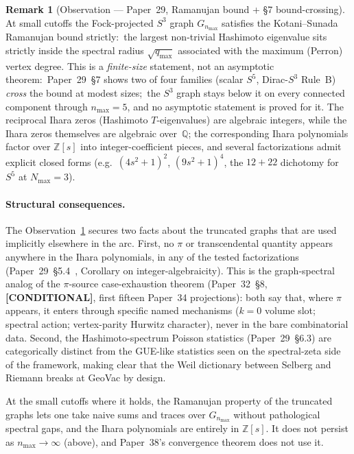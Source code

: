 \documentclass[11pt,a4paper]{article}
\theoremstyle{plain}
\theoremstyle{definition}
\newtheorem{remark}[theorem]{Remark}
\newcommand{\nmax}{n_{\max}}
\newcommand{\sthree}{S^{3}}
\newcommand{\sfive}{S^{5}}
\newcommand{\Z}{\mathbb{Z}}
\newcommand{\gvc}[2]{#2}
\begin{document}
\begin{remark}[Observation --- Paper~29, Ramanujan bound + \S7 bound-crossing]
\label{thm:ramanujan}
At small cutoffs the Fock-projected $\sthree$ graph $G_{\nmax}$
satisfies the Kotani--Sunada Ramanujan bound strictly:\ the largest
non-trivial Hashimoto eigenvalue sits strictly inside the spectral
radius $\sqrt{q_{\max}}$ associated with the maximum (Perron) vertex
degree.  This is a \emph{finite-size} statement, not an asymptotic
theorem:\ Paper~29~\S7 shows two of four families (scalar $\sfive$,
Dirac-$\sthree$ Rule~B) \emph{cross} the bound at modest sizes;\ the
$\sthree$ graph stays below it on every connected component through
$\nmax = 5$, and no asymptotic statement is proved for it.  The
reciprocal Ihara zeros (Hashimoto $T$-eigenvalues) are algebraic
integers, while the Ihara zeros themselves are algebraic over~$\mathbb{Q}$;
the corresponding Ihara polynomials factor over $\Z[s]$ into
integer-coefficient pieces, and several factorizations admit explicit
closed forms
(e.g.~$(4s^{2}+1)^{2}$, $(9s^{2}+1)^{4}$, the $12 + 22$ dichotomy for
$\sfive$ at $N_{\max} = 3$).
\end{remark}

\paragraph{Structural consequences.}
The Observation~\ref{thm:ramanujan} secures two facts about the truncated
graphs that are used implicitly elsewhere in the arc.  First, no $\pi$
or transcendental quantity appears anywhere in the Ihara
polynomials, in any of the tested factorizations
(Paper~29~\S 5.4~\cite{paper29}, Corollary on integer-algebraicity).
This is the graph-spectral analog of \gvc{pi-source-case-exhaustion}{the
$\pi$-source case-exhaustion theorem (Paper~32~\S 8, \textbf{[CONDITIONAL]},
first fifteen Paper~34 projections)}: both say that, where $\pi$ appears,
it enters through specific named mechanisms ($k = 0$ volume slot;
spectral action; vertex-parity Hurwitz character), never in the bare
combinatorial data.  Second, the Hashimoto-spectrum Poisson
statistics (Paper~29~\S 6.3) are categorically distinct from the
GUE-like statistics seen on the spectral-zeta side of the framework,
making clear that the Weil dictionary between Selberg and Riemann
breaks at GeoVac by design.

At the small cutoffs where it holds, the Ramanujan property of the
truncated graphs lets one take naive sums and traces over $G_{\nmax}$
without pathological spectral gaps, and the Ihara polynomials are entirely
in $\Z[s]$.  It does not persist as $\nmax \to \infty$ (above), and
Paper~38's convergence theorem does not use it.
\end{document}
